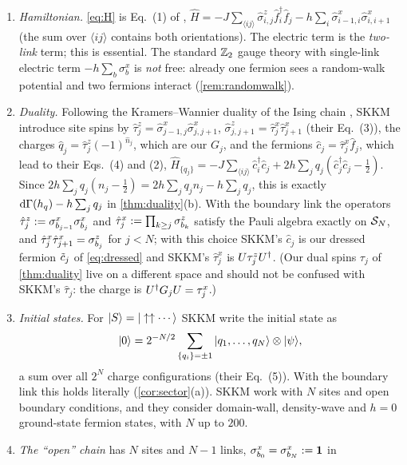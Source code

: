 \begin{remark}\label{rem:boundary}
\leavevmode
\begin{enumerate}[label=(\alph*)]
\item \emph{Hamiltonian.}  \eqref{eq:H} is Eq.~(1) of \cite{SKKM2017},
$\hat H=-J\sum_{\langle ij\rangle}\hat\sigma^z_{i,j}\hat f_i^\dagger\hat f_j
-h\sum_i\hat\sigma^x_{i-1,i}\hat\sigma^x_{i,i+1}$ (the sum over $\langle ij\rangle$ contains both
orientations).  The electric term is the \emph{two-link} term; this is essential.  The standard
$\mathbb{Z}_2$ gauge theory with single-link electric term $-h\sum_b\sigma^x_b$ is \emph{not} free:
already one fermion sees a random-walk potential and two fermions interact
(\cref{rem:randomwalk}).
\item \emph{Duality.}  Following the Kramers--Wannier duality of the Ising chain
\cite{KramersWannier1941,FradkinSusskind1978}, SKKM introduce site spins by
$\hat\tau^z_j=\hat\sigma^x_{j-1,j}\hat\sigma^x_{j,j+1}$,
$\hat\sigma^z_{j,j+1}=\hat\tau^x_j\hat\tau^x_{j+1}$ (their Eq.~(3)), the charges
$\hat q_j=\hat\tau^z_j(-1)^{\hat n_j}$, which are our $G_j$, and the fermions
$\hat c_j=\hat\tau^x_j\hat f_j$, which lead to their Eqs.~(4) and (2),
$\hat H_{\{q_j\}}=-J\sum_{\langle ij\rangle}\hat c_i^\dagger\hat c_j+2h\sum_jq_j(\hat c_j^\dagger\hat c_j-\tfrac12)$.
Since $2h\sum_jq_j(n_j-\frac12)=2h\sum_jq_jn_j-h\sum_jq_j$, this is exactly
$\mathrm{d}\Gamma(h_{q})-h\sum_jq_j$ in \cref{thm:duality}(b).  With the boundary link the operators
$\hat\tau^z_j:=\sigma^{x}_{b_{j-1}}\sigma^{x}_{b_{j}}$ and $\hat\tau^x_j:=\prod_{k\ge j}\sigma^{z}_{b_{k}}$ satisfy the Pauli
algebra exactly on $\mathcal{S}_N$, and $\hat\tau^x_j\hat\tau^x_{j+1}=\sigma^{z}_{b_{j}}$ for $j<N$; with this
choice SKKM's $\hat c_j$ is our dressed fermion $\tilde c_j$ of \eqref{eq:dressed} and SKKM's $\hat\tau^x_j$
is $U\tau^{z}_{j}U^\dagger$.  (Our dual spins $\tau_j$ of \cref{thm:duality} live on a different space
and should not be confused with SKKM's $\hat\tau_j$: the charge is $U^\dagger G_jU=\tau^{x}_{j}$.)
\item \emph{Initial states.}  For $|S\rangle=|\uparrow\uparrow\cdots\rangle$ SKKM write the initial state as
\[
  |0\rangle=2^{-N/2}\sum_{\{q_i\}=\pm1}|q_1,\dots,q_N\rangle\otimes|\psi\rangle,
\]
a sum over all $2^N$ charge configurations (their Eq.~(5)).  With the boundary link this holds literally
(\cref{cor:sector}(a)).  SKKM work with $N$ sites and open boundary conditions, and they
consider domain-wall, density-wave and $h=0$ ground-state fermion states, with $N$ up to $200$.
\item \emph{The ``open'' chain} has $N$ sites and $N-1$ links, $\sigma^{x}_{b_{0}}=\sigma^{x}_{b_{N}}:=\mathbf{1}$ in

\end{enumerate}
\end{remark}
